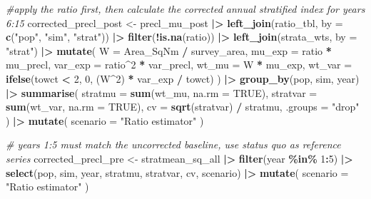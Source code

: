 \documentclass[
]{article}
\newenvironment{Shaded}{\begin{snugshade}}{\end{snugshade}}
\newcommand{\AttributeTok}[1]{\textcolor[rgb]{0.13,0.29,0.53}{#1}}
\newcommand{\CommentTok}[1]{\textcolor[rgb]{0.56,0.35,0.01}{\textit{#1}}}
\newcommand{\ConstantTok}[1]{\textcolor[rgb]{0.56,0.35,0.01}{#1}}
\newcommand{\DecValTok}[1]{\textcolor[rgb]{0.00,0.00,0.81}{#1}}
\newcommand{\FunctionTok}[1]{\textcolor[rgb]{0.13,0.29,0.53}{\textbf{#1}}}
\newcommand{\NormalTok}[1]{#1}
\newcommand{\OtherTok}[1]{\textcolor[rgb]{0.56,0.35,0.01}{#1}}
\newcommand{\SpecialCharTok}[1]{\textcolor[rgb]{0.81,0.36,0.00}{\textbf{#1}}}
\newcommand{\StringTok}[1]{\textcolor[rgb]{0.31,0.60,0.02}{#1}}
\begin{document}
\begin{Shaded}
\begin{Highlighting}[]
\CommentTok{\#apply the ratio first, then calculate the corrected annual stratified index for years 6:15}
\NormalTok{corrected\_precl\_post }\OtherTok{\textless{}{-}}\NormalTok{ precl\_mu\_post }\SpecialCharTok{|\textgreater{}}
  \FunctionTok{left\_join}\NormalTok{(ratio\_tbl, }\AttributeTok{by =} \FunctionTok{c}\NormalTok{(}\StringTok{"pop"}\NormalTok{, }\StringTok{"sim"}\NormalTok{, }\StringTok{"strat"}\NormalTok{)) }\SpecialCharTok{|\textgreater{}}
  \FunctionTok{filter}\NormalTok{(}\SpecialCharTok{!}\FunctionTok{is.na}\NormalTok{(ratio)) }\SpecialCharTok{|\textgreater{}}
  \FunctionTok{left\_join}\NormalTok{(strata\_wts, }\AttributeTok{by =} \StringTok{"strat"}\NormalTok{) }\SpecialCharTok{|\textgreater{}}
  \FunctionTok{mutate}\NormalTok{(}
    \AttributeTok{W =}\NormalTok{ Area\_SqNm }\SpecialCharTok{/}\NormalTok{ survey\_area,}
    \AttributeTok{mu\_exp =}\NormalTok{ ratio }\SpecialCharTok{*}\NormalTok{ mu\_precl,}
    \AttributeTok{var\_exp =}\NormalTok{ ratio}\SpecialCharTok{\^{}}\DecValTok{2} \SpecialCharTok{*}\NormalTok{ var\_precl,}
    \AttributeTok{wt\_mu =}\NormalTok{ W }\SpecialCharTok{*}\NormalTok{ mu\_exp,}
    \AttributeTok{wt\_var =} \FunctionTok{ifelse}\NormalTok{(towct }\SpecialCharTok{\textless{}} \DecValTok{2}\NormalTok{, }\DecValTok{0}\NormalTok{, (W}\SpecialCharTok{\^{}}\DecValTok{2}\NormalTok{) }\SpecialCharTok{*}\NormalTok{ var\_exp }\SpecialCharTok{/}\NormalTok{ towct)}
\NormalTok{  ) }\SpecialCharTok{|\textgreater{}}
  \FunctionTok{group\_by}\NormalTok{(pop, sim, year) }\SpecialCharTok{|\textgreater{}}
  \FunctionTok{summarise}\NormalTok{(}
    \AttributeTok{stratmu =} \FunctionTok{sum}\NormalTok{(wt\_mu, }\AttributeTok{na.rm =} \ConstantTok{TRUE}\NormalTok{),}
    \AttributeTok{stratvar =} \FunctionTok{sum}\NormalTok{(wt\_var, }\AttributeTok{na.rm =} \ConstantTok{TRUE}\NormalTok{),}
    \AttributeTok{cv =} \FunctionTok{sqrt}\NormalTok{(stratvar) }\SpecialCharTok{/}\NormalTok{ stratmu,}
    \AttributeTok{.groups =} \StringTok{"drop"}
\NormalTok{  ) }\SpecialCharTok{|\textgreater{}}
  \FunctionTok{mutate}\NormalTok{(}
    \AttributeTok{scenario =} \StringTok{"Ratio estimator"}
\NormalTok{  )}


\CommentTok{\# years 1:5 must match the uncorrected baseline, use status quo as reference series}
\NormalTok{corrected\_precl\_pre }\OtherTok{\textless{}{-}}\NormalTok{ stratmean\_sq\_all }\SpecialCharTok{|\textgreater{}}
  \FunctionTok{filter}\NormalTok{(year }\SpecialCharTok{\%in\%} \DecValTok{1}\SpecialCharTok{:}\DecValTok{5}\NormalTok{) }\SpecialCharTok{|\textgreater{}}
  \FunctionTok{select}\NormalTok{(pop, sim, year, stratmu, stratvar, cv, scenario) }\SpecialCharTok{|\textgreater{}}
  \FunctionTok{mutate}\NormalTok{(}
    \AttributeTok{scenario =} \StringTok{"Ratio estimator"}
\NormalTok{  )}


\end{Highlighting}
\end{Shaded}
\end{document}
